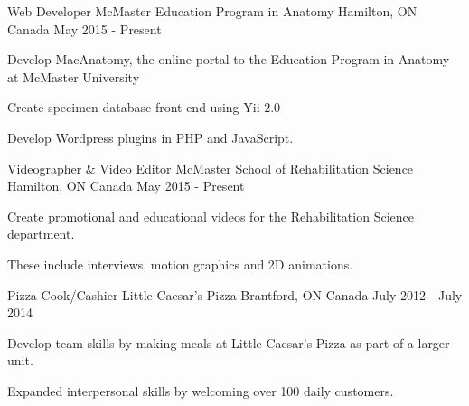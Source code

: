 


\begin{cventries}


\cventry
{Web Developer} %
{McMaster Education Program in Anatomy} %
{Hamilton, ON Canada} %
{May 2015 - Present} %
{ %
\begin{cvitems}
\item {Develop MacAnatomy, the online portal to the Education Program in 
Anatomy at McMaster University}
\item {Create specimen database front end using Yii 2.0}
\item {Develop Wordpress plugins in PHP and JavaScript.}
\end{cvitems}
}


\cventry
{Videographer \& Video Editor} %
{McMaster School of Rehabilitation Science} %
{Hamilton, ON Canada} %
{May 2015 - Present} %
{ %
\begin{cvitems}
\item {Create promotional and educational videos for the Rehabilitation Science 
department.}
\item {These include interviews, motion graphics and 2D animations.}
\end{cvitems}
}


\cventry
{Pizza Cook/Cashier} %
{Little Caesar's Pizza} %
{Brantford, ON Canada} %
{July 2012 - July 2014} %
{ %
\begin{cvitems}
\item {Develop team skills by making meals at Little Caesar's Pizza as part of 
a larger unit.}
\item {Expanded interpersonal skills by welcoming over 100 daily customers.}
\end{cvitems} 
}


\end{cventries}
